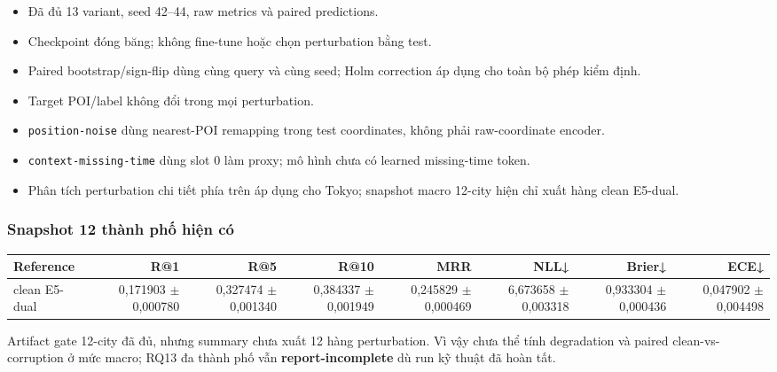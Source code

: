 \begin{itemize}
\item Đã đủ 13 variant, seed 42--44, raw metrics và paired predictions.
\item Checkpoint đóng băng; không fine-tune hoặc chọn perturbation bằng test.
\item Paired bootstrap/sign-flip dùng cùng query và cùng seed; Holm correction áp dụng cho toàn bộ phép kiểm định.
\item Target POI/label không đổi trong mọi perturbation.
\item \texttt{position-noise} dùng nearest-POI remapping trong test coordinates, không phải raw-coordinate encoder.
\item \texttt{context-missing-time} dùng slot 0 làm proxy; mô hình chưa có learned missing-time token.
\item Phân tích perturbation chi tiết phía trên áp dụng cho Tokyo; snapshot macro 12-city hiện chỉ xuất hàng clean E5-dual.
\end{itemize}

\subsubsection*{Snapshot 12 thành phố hiện có}

\begin{table}[!htbp]
\centering
\scriptsize
\setlength{\tabcolsep}{2.5pt}
\begin{adjustbox}{max width=\textwidth}
\begin{tabular}{@{}lrrrrrrr@{}}
\toprule
Reference & R@1 & R@5 & R@10 & MRR & NLL↓ & Brier↓ & ECE↓ \\
\midrule
clean E5-dual & 0,171903 $\pm$ 0,000780 & 0,327474 $\pm$ 0,001340 & 0,384337 $\pm$ 0,001949 & 0,245829 $\pm$ 0,000469 & 6,673658 $\pm$ 0,003318 & 0,933304 $\pm$ 0,000436 & 0,047902 $\pm$ 0,004498 \\
\bottomrule
\end{tabular}
\end{adjustbox}
\end{table}

Artifact gate 12-city đã đủ, nhưng summary chưa xuất 12 hàng perturbation. Vì vậy chưa thể tính degradation và paired clean-vs-corruption ở mức macro; RQ13 đa thành phố vẫn \textbf{report-incomplete} dù run kỹ thuật đã hoàn tất.
